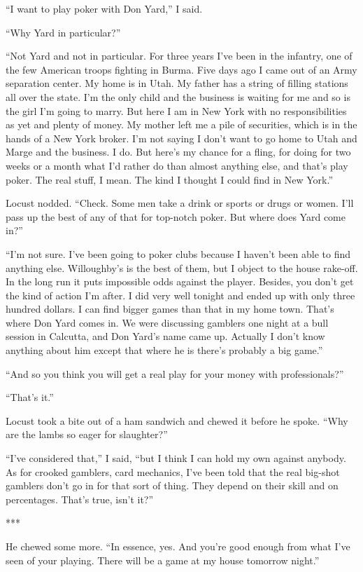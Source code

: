 \documentclass{novel}
\begin{document}
{“I want to play poker with Don Yard,” I said.

“Why Yard in particular?”

“Not Yard and not in particular. For three years I’ve been in the infantry, one of the few American troops fighting in Burma. Five days ago I came out of an Army separation center. My home is in Utah. My father has a string of filling stations all over the state. I’m the only child and the business is waiting for me and so is the girl I’m going to marry. But here I am in New York with no responsibilities as yet and plenty of money. My mother left me a pile of securities, which is in the hands of a New York broker. I’m not saying I don’t want to go home to Utah and Marge and the business. I do. But here’s my chance for a fling, for doing for two weeks or a month what I’d rather do than almost anything else, and that’s play poker. The real stuff, I mean. The kind I thought I could find in New York.”

Locust nodded. “Check. Some men take a drink or sports or drugs or women. I’ll pass up the best of any of that for top-notch poker. But where does Yard come in?”

“I’m not sure. I’ve been going to poker clubs because I haven’t been able to find anything else. Willoughby’s is the best of them, but I object to the house rake-off. In the long run it puts impossible odds against the player. Besides, you don’t get the kind of action I’m after. I did very well tonight and ended up with only three hundred dollars. I can find bigger games than that in my home town. That’s where Don Yard comes in. We were discussing gamblers one night at a bull session in Calcutta, and Don Yard’s name came up. Actually I don’t know anything about him except that where he is there’s probably a big game.”

“And so you think you will get a real play for your money with professionals?”

“That’s it.”

Locust took a bite out of a ham sandwich and chewed it before he spoke. “Why are the lambs so eager for slaughter?”

“I’ve considered that,” I said, “but I think I can hold my own against anybody. As for crooked gamblers, card mechanics, I’ve been told that the real big-shot gamblers don’t go in for that sort of thing. They depend on their skill and on percentages. That’s true, isn’t it?”

***

He chewed some more. “In essence, yes. And you’re good enough from what I’ve seen of your playing. There will be a game at my house tomorrow night.”

}
\end{document}
